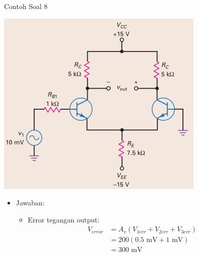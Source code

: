 \documentclass[aspectratio=169]{beamer}
\begin{document}
\begin{frame}{Contoh Soal 8}
	\begin{multicols}{2}
		\begin{center}
			\includegraphics[height=0.7\textheight]{gambar/01.latihan_soal_8}
		\end{center}
		\columnbreak
		\begin{itemize}
			\item Jawaban:
			\begin{itemize}
				\item Error tegangan output:
				\begin{align*}
					V_{error} &= A_v (V_{1err} + V_{2err} + V_{3err}) \\
					&= 200(0.5 \text{ mV} + 1 \text{ mV}) \\
					&= 300 \text{ mV}
				\end{align*}
			\end{itemize}
		\end{itemize}
	\end{multicols}
\end{frame}
\end{document}
